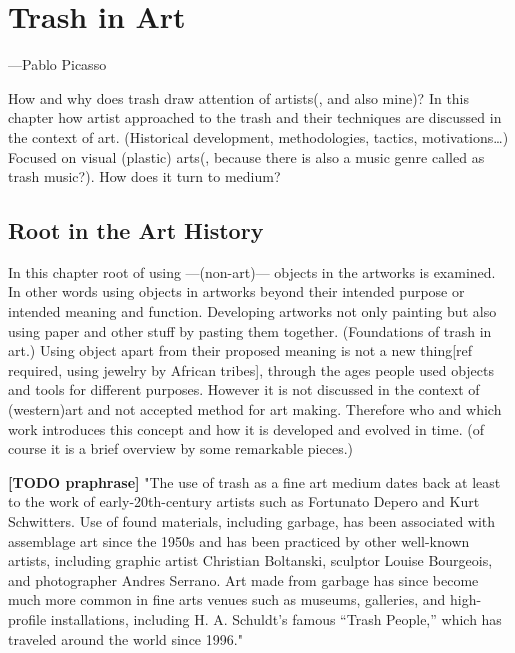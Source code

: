 \chapter{Trash in Art}

\epigraph{\textit{}}{\hfill ---Pablo Picasso}

How and why does trash draw attention of artists(, and also mine)? In this chapter how artist approached to the trash and their techniques are discussed in the context of art. (Historical development, methodologies, tactics, motivations\ldots) Focused on visual (plastic) arts(, because there is also a music genre called as trash music?). How does it turn to medium?


\section{Root in the Art History}
In this chapter root of using ---(non-art)--- objects in the artworks is examined. In other words using objects in artworks beyond their intended purpose or intended meaning and function. Developing artworks not only painting but also using paper and other stuff by pasting them together. (Foundations of trash in art.) Using object apart from their proposed meaning is not a new thing[ref required, using jewelry by African tribes], through the ages people used objects and tools for different purposes. However it is not discussed in the context of (western)art and not accepted method for art making. Therefore who and which work introduces this concept and how it is developed and evolved in time. (of course it is a brief overview by some remarkable pieces.)

\textbf{[TODO praphrase]} "The use of trash as a fine art medium dates back at least to the work of early-20th-century artists such as Fortunato Depero and Kurt Schwitters. Use of found materials, including garbage, has been associated with assemblage art since the 1950s and has been practiced by other well-known artists, including graphic artist Christian Boltanski, sculptor Louise Bourgeois, and photographer Andres Serrano. Art made from garbage has since become much more common in fine arts venues such as museums, galleries, and high-profile installations, including H. A. Schuldt’s famous “Trash People,” which has traveled around the world since 1996." \cite{tauxe2012encyclopedia}


